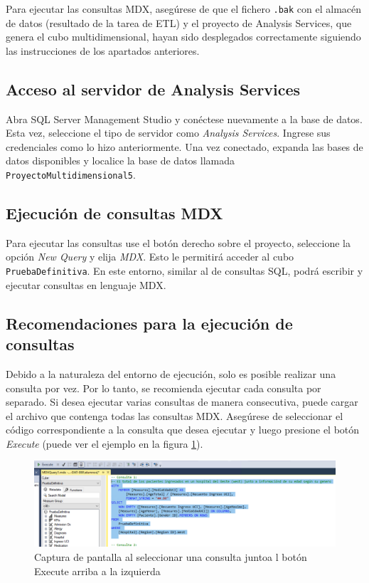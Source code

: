 \documentclass[12pt, a4paper, twoside]{article}
\begin{document}
	Para ejecutar las consultas MDX, asegúrese de que el fichero \texttt{.bak} con el almacén de datos (resultado de la tarea de ETL) y el proyecto de Analysis Services, que genera el cubo multidimensional, hayan sido desplegados correctamente siguiendo las instrucciones de los apartados anteriores.
	
	\subsection{Acceso al servidor de Analysis Services}
	Abra SQL Server Management Studio y conéctese nuevamente a la base de datos. Esta vez, seleccione el tipo de servidor como \textit{Analysis Services}. Ingrese sus credenciales como lo hizo anteriormente. Una vez conectado, expanda las bases de datos disponibles y localice la base de datos llamada \texttt{ProyectoMultidimensional5}.
	
	\subsection{Ejecución de consultas MDX}
	Para ejecutar las consultas use el botón derecho sobre el proyecto, seleccione la opción \textit{New Query} y elija \textit{MDX}. Esto le permitirá acceder al cubo \texttt{PruebaDefinitiva}. En este entorno, similar al de consultas SQL, podrá escribir y ejecutar consultas en lenguaje MDX.
	
	\subsection{Recomendaciones para la ejecución de consultas}
	Debido a la naturaleza del entorno de ejecución, solo es posible realizar una consulta por vez. Por lo tanto, se recomienda ejecutar cada consulta por separado. Si desea ejecutar varias consultas de manera consecutiva, puede cargar el archivo que contenga todas las consultas MDX. Asegúrese de seleccionar el código correspondiente a la consulta que desea ejecutar y luego presione el botón \textit{Execute} (puede ver el ejemplo en la figura \ref{fig:final}).
	
	
	\begin{figure}[H]
		\centering
		\includegraphics[width=1\textwidth]{image/final.png}
		\caption{Captura de pantalla al seleccionar una consulta juntoa l botón Execute arriba a la izquierda}
		\label{fig:final}
	\end{figure}
		
\end{document}
